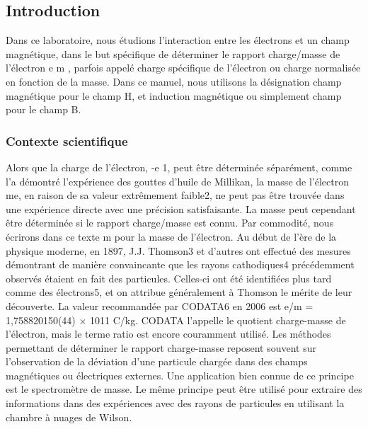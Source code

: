 \documentclass[../main.tex]{subfiles}
\begin{document}
\subsection{Introduction}
Dans ce laboratoire, nous étudions l'interaction entre les électrons et un champ magnétique, dans le but spécifique de déterminer le rapport charge/masse de l'électron e m , parfois appelé charge spécifique de l'électron ou charge normalisée en fonction de la masse. Dans ce manuel, nous utilisons la désignation champ magnétique pour le champ H, et induction magnétique ou simplement champ pour le champ B. 
\subsubsection{Contexte scientifique}
Alors que la charge de l'électron, -e 1, peut être déterminée séparément, comme l'a démontré l'expérience des gouttes d'huile de Millikan, la masse de l'électron me, en raison de sa valeur extrêmement faible2, ne peut pas être trouvée dans une expérience directe avec une précision satisfaisante. La masse peut cependant être déterminée si le rapport charge/masse est connu. Par commodité, nous écrirons dans ce texte m pour la masse de l'électron. Au début de l'ère de la physique moderne, en 1897, J.J. Thomson3 et d'autres ont effectué des mesures démontrant de manière convaincante que les rayons cathodiques4 précédemment observés étaient en fait des particules. Celles-ci ont été identifiées plus tard comme des électrons5, et on attribue généralement à Thomson le mérite de leur découverte. La valeur recommandée par CODATA6 en 2006 est e/m = 1,758820150(44) × 1011 C/kg. CODATA l'appelle le quotient charge-masse de l'électron, mais le terme ratio est encore couramment utilisé. Les méthodes permettant de déterminer le rapport charge-masse reposent souvent sur l'observation de la déviation d'une particule chargée dans des champs magnétiques ou électriques externes. Une application bien connue de ce principe est le spectromètre de masse. Le même principe peut être utilisé pour extraire des informations dans des expériences avec des rayons de particules en utilisant la chambre à nuages de Wilson.
\end{document}
